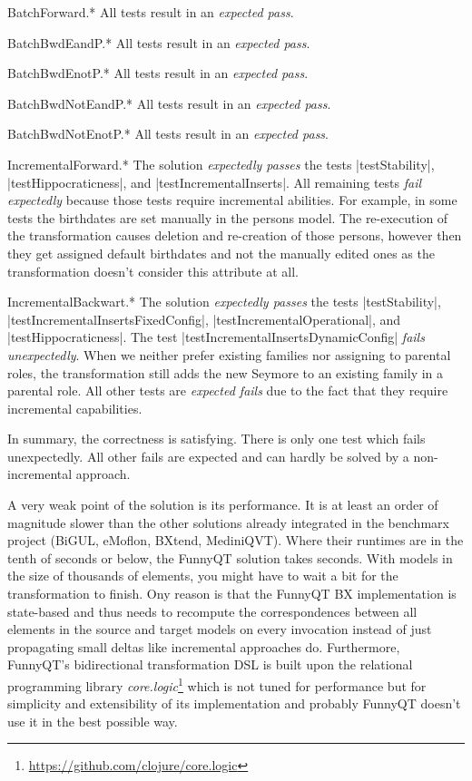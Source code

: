 \documentclass[a4paper]{article}
\newcommand{\code}{\clojureinline}
\begin{document}
\begin{compactdesc}
\item[BatchForward.*] All tests result in an \emph{expected pass}.
\item[BatchBwdEandP.*] All tests result in an \emph{expected pass}.
\item[BatchBwdEnotP.*] All tests result in an \emph{expected pass}.
\item[BatchBwdNotEandP.*] All tests result in an \emph{expected pass}.
\item[BatchBwdNotEnotP.*] All tests result in an \emph{expected pass}.
\item[IncrementalForward.*] The solution \emph{expectedly passes} the tests
  \code|testStability|, \code|testHippocraticness|, and
  \code|testIncrementalInserts|.  All remaining tests \emph{fail expectedly}
  because those tests require incremental abilities.  For example, in some
  tests the birthdates are set manually in the persons model.  The re-execution
  of the transformation causes deletion and re-creation of those persons,
  however then they get assigned default birthdates and not the manually edited
  ones as the transformation doesn't consider this attribute at all.
\item[IncrementalBackwart.*] The solution \emph{expectedly passes} the tests
  \code|testStability|, \code|testIncrementalInsertsFixedConfig|,
  \code|testIncrementalOperational|, and \code|testHippocraticness|.  The test
  \code|testIncrementalInsertsDynamicConfig| \emph{fails unexpectedly}.  When
  we neither prefer existing families nor assigning to parental roles, the
  transformation still adds the new Seymore to an existing family in a parental
  role.  All other tests are \emph{expected fails} due to the fact that they
  require incremental capabilities.
\end{compactdesc}

In summary, the correctness is satisfying.  There is only one test which fails
unexpectedly.  All other fails are expected and can hardly be solved by a
non-incremental approach.

A very weak point of the solution is its performance.  It is at least an order
of magnitude slower than the other solutions already integrated in the
benchmarx project (BiGUL, eMoflon, BXtend, MediniQVT).  Where their runtimes
are in the tenth of seconds or below, the FunnyQT solution takes seconds.  With
models in the size of thousands of elements, you might have to wait a bit for
the transformation to finish.  Ony reason is that the FunnyQT BX implementation
is state-based and thus needs to recompute the correspondences between all
elements in the source and target models on every invocation instead of just
propagating small deltas like incremental approaches do.  Furthermore,
FunnyQT's bidirectional transformation DSL is built upon the relational
programming library
\emph{core.logic}\footnote{\url{https://github.com/clojure/core.logic}} which
is not tuned for performance but for simplicity and extensibility of its
implementation and probably FunnyQT doesn't use it in the best possible way.
\end{document}
